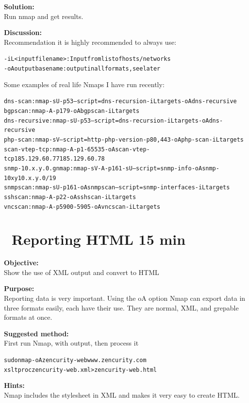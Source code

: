 \documentclass[a4paper,11pt,notitlepage]{report}
\begin{document}
{\bf Solution:}\\
Run nmap and get results.

{\bf Discussion:}\\
Recommendation it is highly recommended to always use:
\begin{alltt}
-iL <inputfilename>: Input from list of hosts/networks
-oA outputbasename: output in all formats, see later
\end{alltt}

Some examples of real life Nmaps I have run recently:
\begin{alltt}
dns-scan: nmap -sU -p 53 --script=dns-recursion -iL targets -oA dns-recursive
bgpscan: nmap -A -p 179 -oA bgpscan -iL targets
dns-recursive: nmap -sU -p 53 --script=dns-recursion -iL targets -oA dns-recursive
php-scan: nmap -sV --script=http-php-version -p80,443 -oA php-scan -iL targets
scan-vtep-tcp: nmap -A -p 1-65535 -oA scan-vtep-tcp 185.129.60.77 185.129.60.78
snmp-10.x.y.0.gnmap: nmap -sV -A -p 161 -sU --script=snmp-info -oA snmp-10xy 10.x.y.0/19
snmpscan: nmap -sU -p 161 -oA snmpscan --script=snmp-interfaces -iL targets
sshscan: nmap -A -p 22 -oA sshscan -iL targets
vncscan: nmap -A -p 5900-5905 -oA vncscan -iL targets
\end{alltt}




\chapter{\faInfoCircle\ Reporting HTML 15 min}
\label{ex:nmap-html}


{\bf Objective:} \\
Show the use of XML output and convert to HTML

{\bf Purpose:}\\
Reporting data is very important. Using the oA option Nmap can export data in three formats easily, each have their use. They are normal, XML, and grepable formats at once.

{\bf Suggested method:}\\
First run Nmap, with output, then process it
\begin{alltt}
  sudo nmap -oA zencurity-web www.zencurity.com
  xsltproc zencurity-web.xml > zencurity-web.html
\end{alltt}

{\bf Hints:} \\
Nmap includes the stylesheet in XML and makes it very easy to create HTML.
\end{document}
